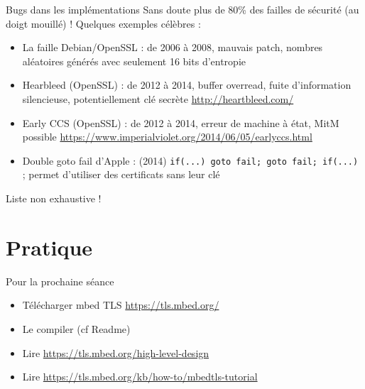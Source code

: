\documentclass{mpg-ep-slides}
\begin{document}
\begin{frame}{Bugs dans les implémentations}
  Sans doute plus de 80\% des failles de sécurité (au doigt mouillé) !
  Quelques exemples célèbres :
  \begin{itemize}
    \item La faille Debian/OpenSSL : de 2006 à 2008, mauvais patch, nombres
      aléatoires générés avec seulement 16 bits d'entropie
    \item Hearbleed (OpenSSL) : de 2012 à 2014, buffer overread, fuite
      d'information silencieuse, potentiellement clé secrète
      \url{http://heartbleed.com/}
    \item Early CCS (OpenSSL) : de 2012 à 2014, erreur de machine à état, MitM
      possible \url{https://www.imperialviolet.org/2014/06/05/earlyccs.html}
    \item Double goto fail d'Apple : (2014) \texttt{if(...) goto fail; goto
        fail; if(...)} ; permet d'utiliser des certificats sans leur clé
  \end{itemize}
  Liste non exhaustive !
\end{frame}

% 

\section{Pratique}
\tocsect

\begin{frame}{Pour la prochaine séance}
  \begin{itemize}
    \item Télécharger mbed TLS \url{https://tls.mbed.org/}
    \item Le compiler (cf Readme)
    \item Lire \url{https://tls.mbed.org/high-level-design}
    \item Lire \url{https://tls.mbed.org/kb/how-to/mbedtls-tutorial}
  \end{itemize}
\end{frame}
\end{document}
